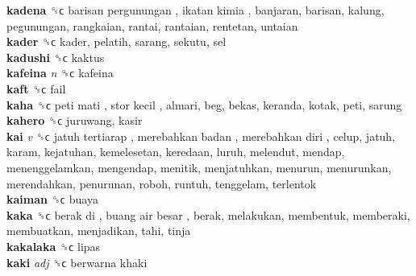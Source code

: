 \textbf{kadena} ␝ϲ   barisan pergunungan ,  ikatan kimia , banjaran, barisan, kalung, pegunungan, rangkaian, rantai, rantaian, rentetan, untaian  \\
\textbf{kader} ␝ϲ  kader, pelatih, sarang, sekutu, sel  \\
\textbf{kadushi} ␝ϲ  kaktus  \\
\textbf{kafeina} \emph{n}  ␝ϲ  kafeina  \\
\textbf{kaft} ␝ϲ  fail  \\
\textbf{kaha} ␝ϲ   peti mati ,  stor kecil , almari, beg, bekas, keranda, kotak, peti, sarung  \\
\textbf{kahero} ␝ϲ  juruwang, kasir  \\
\textbf{kai} \emph{v}  ␝ϲ   jatuh tertiarap ,  merebahkan badan ,  merebahkan diri , celup, jatuh, karam, kejatuhan, kemelesetan, keredaan, luruh, melendut, mendap, menenggelamkan, mengendap, menitik, menjatuhkan, menurun, menurunkan, merendahkan, penurunan, roboh, runtuh, tenggelam, terlentok  \\
\textbf{kaiman} ␝ϲ  buaya  \\
\textbf{kaka} ␝ϲ   berak di ,  buang air besar , berak, melakukan, membentuk, memberaki, membuatkan, menjadikan, tahi, tinja  \\
\textbf{kakalaka} ␝ϲ  lipas  \\
\textbf{kaki} \emph{adj}  ␝ϲ   berwarna khaki   \\
